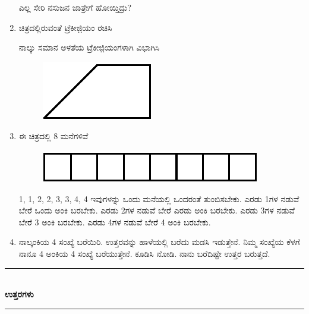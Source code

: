 \begin{enumerate}
ಎಲ್ಲ ಸೇರಿ ನಸುಜನ ಜಾತ್ರೇಗೆ ಹೋಯ್ತಿದ್ರು? 

\item ಚಿತ್ರದಲ್ಲಿರುವಂತೆ ಟ್ರೆಕೀಜಿ಼ಯಂ ರಚಿಸಿ 

ನಾಲ್ಕು ಸಮಾನ ಅಳತೆಯ ಟ್ರೆಕೀಜಿ಼ಯಂಗಳಾಗಿ ವಿಭಾಗಿಸಿ 
\begin{figure}[H]
\centering
\includegraphics[scale=1.5]{images/chap2/q28.eps}
\end{figure}
 
 \eject
 
 \item ಈ ಚಿತ್ರದಲ್ಲಿ 8 ಮನೆಗಳಿವೆ 
 \begin{figure}[H]
\centering
\includegraphics{images/chap2/q29.eps}
\end{figure}

1, 1, 2, 2, 3, 3, 4, 4 ಇವುಗಳನ್ನು ಒಂದು ಮನೆಯಲ್ಲಿ ಒಂದರಂತೆ ತುಂಬಿಸಬೇಕು. ಎರಡು 1ಗಳ ನಡುವೆ ಬೇರೆ ಒಂದು ಅಂಕಿ ಬರಬೇಕು. ಎರಡು 2ಗಳ ನಡುವೆ ಬೇರೆ ಎರಡು ಅಂಕಿ ಬರಬೇಕು. ಎರಡು 3ಗಳ ನಡುವೆ ಬೇರೆ 3 ಅಂಕಿ ಬರಬೇಕು. ಎರಡು 4ಗಳ ನಡುವೆ ಬೇರೆ 4 ಅಂಕಿ ಬರಬೇಕು.

\item ನಾಲ್ಕಂಕಿಯ 4 ಸಂಖ್ಯೆ ಬರೆಯಿರಿ. ಉತ್ತರವನ್ನು ಹಾಳೆಯಲ್ಲಿ ಬರೆದು ಮಡಸಿ ಇಡುತ್ತೇನೆ. ನಿಮ್ಮ ಸಂಖ್ಯೆಯ ಕೆಳಗೆ ನಾನೂ 4 ಅಂಕಿಯ 4 ಸಂಖ್ಯೆ ಬರೆಯುತ್ತೇನೆ. ಕೂಡಿಸಿ ನೋಡಿ. ನಾನು ಬರೆದಿಷ್ಟೇ ಉತ್ತರ ಬರುತ್ತದೆ. 
\end{enumerate}

\smallskip

\begin{center}
\rule{5cm}{1pt}\\[3pt]
{\Large\bfseries ಉತ್ತರಗಳು}\\[-0.1cm]
\rule{5cm}{1pt}
\end{center}

